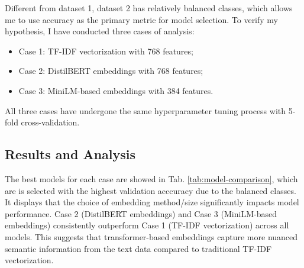 \documentclass[conference]{IEEEtran}
\begin{document}
Different from dataset 1, dataset 2 has relatively balanced classes, which allows me to use accuracy as the primary metric for model selection. To verify my hypothesis, I have conducted three cases of analysis:

\begin{itemize}
    \item Case 1: TF-IDF vectorization with 768 features;
    \item Case 2: DistilBERT embeddings with 768 features;
    \item Case 3: MiniLM-based embeddings with 384 features.
\end{itemize}
All three cases have undergone the same hyperparameter tuning process with 5-fold cross-validation.

\subsection{Results and Analysis}
The best models for each case are showed in Tab. \ref{tab:model-comparison}, which are is selected with the highest validation acccuracy due to the balanced classes. It displays that  the choice of embedding method/size significantly impacts model performance. Case 2 (DistilBERT embeddings) and Case 3 (MiniLM-based embeddings) consistently outperform Case 1 (TF-IDF vectorization) across all models. This suggests that transformer-based embeddings capture more nuanced semantic information from the text data compared to traditional TF-IDF vectorization.
\end{document}
